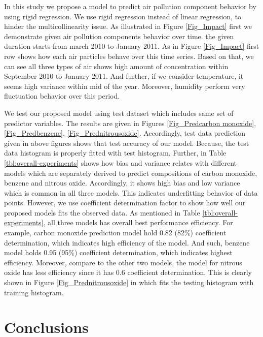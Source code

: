 In this study we propose a model to predict air 
pollution component behavior by using rigid regression. 
We use rigid regression instead of linear regression,
to hinder the multicollinearity issue. 
As illustrated in Figure \ref{Fig_Impact} first we 
demonstrate given air pollution components behavior over time.
the given duration starts from march 2010 to January 2011.
As in Figure \ref{Fig_Impact} first row shows how each 
air particles behave over this time series. 
Based on that, we can see all three types of air shows 
high amount of concentration within September 2010 to January 2011.
And further, if we consider temperature, it seems high variance within mid of the year.
Moreover, humidity perform very fluctuation behavior over this period.

We test our proposed model using test dataset which 
includes same set of predictor variables.
The results are given in Figures \ref{Fig_Predcarbon monoxide}, \ref{Fig_Predbenzene}, \ref{Fig_Prednitrousoxide}.
Accordingly, test data prediction given in above 
figures shows that test accuracy of our model. 
Because, the test data histogram is properly fitted with test histogram.
Further, in Table \ref{tbl:overall-experiments} shows how bias and variance relates with 
different models which are separately derived to 
predict compositions of carbon monoxide, benzene and nitrous oxide.
Accordingly, it shows high bias and low variance which is common in all three models.
This indicates underfitting behavior of data points.
However, we use coefficient determination factor to 
show how well our proposed models fits the observed data. 
As mentioned in Table \ref{tbl:overall-experiments}, 
all three models has overall best performance efficiency. 
For example, carbon monoxide prediction model hold 0.82 (82\%) coefficient determination, which indicates high efficiency of the model.
And such, benzene model holds 0.95 (95\%) coefficient determination, which indicates highest efficiency.
Moreover, compare to the other two models, the model for nitrous oxide has less efficiency since it has 0.6 coefficient determination. 
This is clearly shown in Figure \ref{Fig_Prednitrousoxide} in which fits the testing histogram with training histogram.

\section{Conclusions} \label{sec-conclusions}

